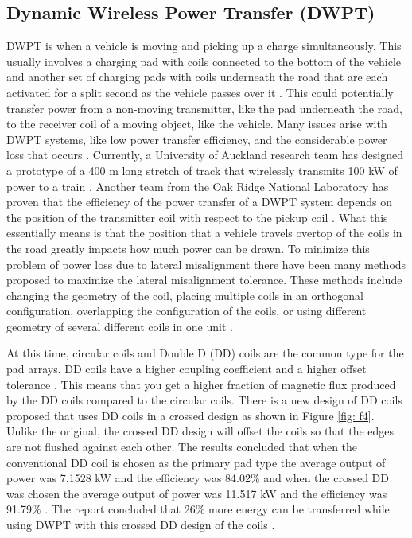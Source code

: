 \subsection{Dynamic Wireless Power Transfer (DWPT)}
\label{sec: s2.4.3}
DWPT is when a vehicle is moving and picking up a charge simultaneously. This usually involves a charging pad with 
coils connected to the bottom of the vehicle and another set of charging pads with coils underneath the road that 
are each activated for a split second as the vehicle passes over it \cite{fisher_electric_2014}.  
This could potentially transfer power from a non-moving transmitter, like the pad underneath the road, to the 
receiver coil of a moving object, like the vehicle. Many issues arise with DWPT systems, like low power transfer 
efficiency, and the considerable power loss that occurs \cite{rakhymbay_precise_2018}. Currently, a University of Auckland 
research team has designed a prototype of a 400 m long stretch of track that wirelessly transmits 100 kW of power 
to a train \cite{rakhymbay_precise_2018}. Another team from the Oak Ridge National Laboratory has proven that the 
efficiency of the power transfer of a DWPT system depends on the position of the transmitter coil with respect to the 
pickup coil \cite{rakhymbay_precise_2018}. What this essentially means is that the position that a vehicle travels overtop 
of the coils in the road greatly impacts how much power can be drawn. To minimize this problem of power loss due to 
lateral misalignment there have been many methods proposed to maximize the lateral misalignment tolerance. These 
methods include changing the geometry of the coil, placing multiple coils in an orthogonal configuration, overlapping 
the configuration of the coils, or using different geometry of several different coils in one unit 
\cite{karam_hwang_autonomous_2017}. 

At this time, circular coils and Double D (DD) coils are the common type for the pad arrays. DD coils have a 
higher coupling coefficient and a higher offset tolerance \cite{xiang_design_2017}. This means 
that you get a higher fraction of magnetic flux produced by the DD coils compared to the circular coils. 
There is a new design of DD coils proposed that uses DD coils in a crossed design as shown in Figure \ref{fig: f4}. 
Unlike the original, the crossed DD design will offset the coils so that the edges are not flushed against each other. 
The results concluded that when the conventional DD coil is chosen as the primary pad type the average output of 
power was 7.1528 kW and the efficiency was 84.02\% and when the crossed DD was chosen the average output of power 
was 11.517 kW and the efficiency was 91.79\% \cite{xiang_design_2017}. The report concluded that 
26\% more energy can be transferred while using DWPT with this crossed DD design of the coils \cite{karam_hwang_autonomous_2017}. 

